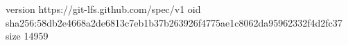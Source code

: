 version https://git-lfs.github.com/spec/v1
oid sha256:58db2e4668a2de6813c7eb1b37b263926f4775ae1c8062da95962332f4d2fc37
size 14959

